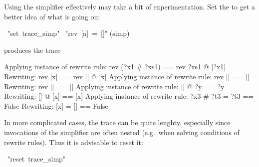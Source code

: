 \begin{isabelle}%
%
\begin{isamarkuptext}%
Using the simplifier effectively may take a bit of experimentation.  Set the
  to get a better idea of what is going
on:%
\end{isamarkuptext}%
\ {"}set\ trace\_simp{"}\isanewline
{}\ {"}rev\ [a]\ =\ []{"}\isanewline
{}(simp)%
\begin{isamarkuptxt}%
\noindent
produces the trace

\begin{ttbox}
Applying instance of rewrite rule:
rev (?x1 \# ?xs1) == rev ?xs1 @ [?x1]
Rewriting:
rev [x] == rev [] @ [x]
Applying instance of rewrite rule:
rev [] == []
Rewriting:
rev [] == []
Applying instance of rewrite rule:
[] @ ?y == ?y
Rewriting:
[] @ [x] == [x]
Applying instance of rewrite rule:
?x3 \# ?t3 = ?t3 == False
Rewriting:
[x] = [] == False
\end{ttbox}

In more complicated cases, the trace can be quite lenghty, especially since
invocations of the simplifier are often nested (e.g.\ when solving conditions
of rewrite rules). Thus it is advisable to reset it:%
\end{isamarkuptxt}%
\ {"}reset\ trace\_simp{"}\isanewline
\end{isabelle}%
